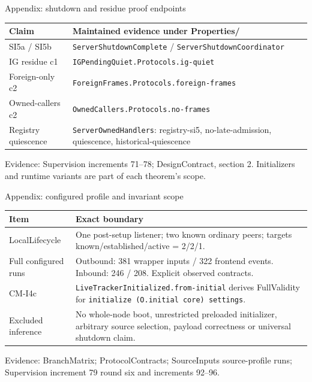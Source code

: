 \documentclass[11pt,aspectratio=169]{beamer}
\newcommand{\evidence}[1]{\vfill{\fontsize{7}{8}\selectfont\color{Muted}Evidence: #1\par}}
\begin{document}
\begin{frame}{Appendix: shutdown and residue proof endpoints}
\small\renewcommand{\arraystretch}{1.2}
\begin{tabularx}{\textwidth}{@{}P{28mm}Y@{}}
\toprule
Claim & Maintained evidence under Properties/ \\ \midrule
SI5a / SI5b & \texttt{ServerShutdownComplete} / \texttt{ServerShutdownCoordinator} \\[2mm]
IG residue c1 & \texttt{IGPendingQuiet.Protocols.ig-quiet} \\[2mm]
Foreign-only c2 & \texttt{ForeignFrames.Protocols.foreign-frames} \\[2mm]
Owned-callers c2 & \texttt{OwnedCallers.Protocols.no-frames} \\[2mm]
Registry quiescence & \texttt{ServerOwnedHandlers}: registry-si5, no-late-admission, quiescence, historical-quiescence \\[2mm]
\bottomrule
\end{tabularx}
\evidence{Supervision increments 71--78; DesignContract, section 2. Initializers and runtime variants are part of each theorem's scope.}
\end{frame}

\begin{frame}{Appendix: configured profile and invariant scope}
\small\renewcommand{\arraystretch}{1.2}
\begin{tabularx}{\textwidth}{@{}P{28mm}Y@{}}
\toprule
Item & Exact boundary \\ \midrule
LocalLifecycle & One post-setup listener; two known ordinary peers; targets known/established/active = 2/2/1. \\[2mm]
Full configured runs & Outbound: 381 wrapper inputs / 322 frontend events. Inbound: 246 / 208. Explicit observed contracts. \\[2mm]
CM-I4c & \texttt{LiveTrackerInitialized.from-initial} derives FullValidity for \texttt{initialize (O.initial core) settings}. \\[2mm]
Excluded inference & No whole-node boot, unrestricted preloaded initializer, arbitrary source selection, payload correctness or universal shutdown claim. \\[2mm]
\bottomrule
\end{tabularx}
\evidence{BranchMatrix; ProtocolContracts; SourceInputs source-profile runs; Supervision increment 79 round six and increments 92--96.}
\end{frame}
\end{document}
